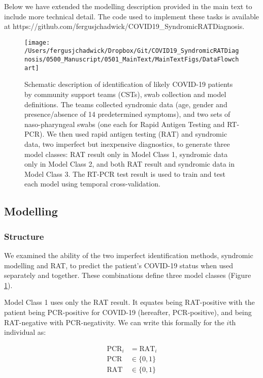 \documentclass[]{elsarticle} %
\begin{document}
Below we have extended the modelling description provided in the main text to include more technical detail.
The code used to implement these tasks is available at https://github.com/fergusjchadwick/COVID19\_SyndromicRATDiagnosis.

\begin{figure}
\texttt{[image: /Users/fergusjchadwick/Dropbox/Git/COVID19\_SyndromicRATDiagnosis/0500\_Manuscript/0501\_MainText/MainTextFigs/DataFlowchart]} \caption{Schematic description of identification of likely COVID-19 patients by community support teams (CSTs), swab collection and model definitions. The teams collected syndromic data (age, gender and presence/absence of 14 predetermined symptoms), and two sets of naso-pharyngeal swabs (one each for Rapid Antigen Testing and RT-PCR). We then used rapid antigen testing (RAT) and syndromic data, two imperfect but inexpensive diagnostics, to generate three model classes: RAT result only in Model Class 1, syndromic data only in Model Class 2, and both RAT result and syndromic data in Model Class 3. The RT-PCR test result is used to train and test each model using temporal cross-validation.}\label{fig:data-flowchart2}
\end{figure}

\hypertarget{modelling}{%
\subsection{Modelling}\label{modelling}}

\hypertarget{structure}{%
\subsubsection{Structure}\label{structure}}

We examined the ability of the two imperfect identification methods, syndromic modelling and RAT, to predict the patient's COVID-19 status when used separately and together.
These combinations define three model classes (Figure \ref{fig:data-flowchart2}).

Model Class 1 uses only the RAT result.
It equates being RAT-positive with the patient being PCR-positive for COVID-19 (hereafter, PCR-positive), and being RAT-negative with PCR-negativity.
We can write this formally for the \(i\)th individual as:

\begin{equation}\begin{aligned}
\text{PCR}_i &= \text{RAT}_i \\
\text{PCR} &\in\{0,1\} \\
\text{RAT} &\in\{0,1\}
\label{eq:ModelClass1}
\end{aligned}\end{equation}\ignorespacesafterend
\end{document}
